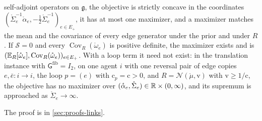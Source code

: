 \begin{enumerate}
self-adjoint operators on $\mathfrak g$, the objective is strictly concave in the coordinates
$(\mathring\Sigma_e^{-1}\mathring\alpha_e,-\tfrac12\mathring\Sigma_e^{-1})_{e\in E_+}$, it has at most
one maximizer, and a maximizer matches the mean and the covariance of every edge generator under
the prior and under $R$. If $\mathscr S=0$ and every $\operatorname{Cov}_R(\mathring\omega_e)$ is
positive definite, the maximizer exists and is
$(\mathbb E_R[\mathring\omega_e],\operatorname{Cov}_R(\mathring\omega_e))_{e\in E_+}$. With a loop term it
need not exist: in the translation instance with $\mathsf G^{\mathrm{fib}}=I_2$, on one agent $i$
with one reversal pair of edge copies $e,\bar e:i\to i$, the loop $p=(e)$ with
$\mathrm c_p=\mathrm c>0$, and $R=\mathcal N(\mathring\mu,\mathrm v)$ with $\mathrm v\geq1/\mathrm c$,
the objective has no maximizer over $(\mathring\alpha_e,\mathring\Sigma_e)\in\mathbb R\times(0,\infty)$, and
its supremum is approached as $\mathring\Sigma_e\to\infty$.
\end{enumerate}

The proof is in \cref{sec:proofs-links}.

